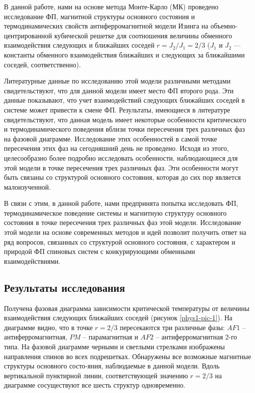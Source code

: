 В данной работе, нами на основе метода Монте-Карло (МК) проведено исследование ФП, магнитной структуры основного состояния и термодинамических свойств антиферромагнитной модели Изинга на объемно-центрированной кубической решетке для соотношения величины обменного взаимодействия следующих и ближайших соседей $r=J_2/J_1=2/3$ ($J_1$ и $J_2$ --- константы обменного взаимодействия ближайших и следующих за ближайшими соседей, соответственно).

Литературные данные по исследованию этой модели различными методами свидетельствуют, что для данной модели имеет место ФП второго рода. Эти данные показывают, что учет взаимодействий следующих ближайших соседей в системе может привести к смене ФП. Результаты, имеющиеся в литературе свидетельствуют, что данная модель имеет некоторые особенности критического и термодинамического поведения вблизи точки пересечения трех различных фаз на фазовой диаграмме. Исследование этих особенностей в самой точке пересечения этих фаз на сегодняшний день не проведено. Исходя из этого, целесообразно более подробно исследовать особенности, наблюдающиеся для этой модели в точке пересечения трех различных фаз. Эти особенности могут быть связаны со структурой основного состояния, которая до сих пор является малоизученной.

В связи с этим, в данной работе, нами предпринята попытка исследовать ФП, термодинамическое поведение системы и магнитную структуру основного состояния в точке пересечения трех различных фаз этой модели. Исследование этой модели на основе современных методов и идей позволит получить ответ на ряд вопросов, связанных со структурой основного состояния, с характером и природой ФП спиновых систем с конкурирующими обменными взаимодействиями.



\subsection{Результаты исследования}



Получена фазовая диаграмма зависимости критической температуры от величины взаимодействия следующих ближайших соседей (рисунок \ref{phys1-pic-1}). На диаграмме видно, что в точке $r=2/3$ пересекаются три различные фазы: $AF1$ -- антиферромагнитная, $PM$ -- парамагнитная и $AF2$ -- антиферромагнитная $2$-го типа. На фазовой диаграмме черными и светлыми стрелками изображены направления спинов во всех подрешетках. Обнаружены все возможные магнитные структуры основного состо-яния, наблюдаемые в данной модели. Вдоль вертикальной пунктирной линии, соответствующей значению $r=2/3$ на диаграмме сосуществуют все шесть структур одновременно.


